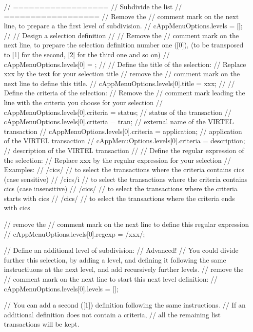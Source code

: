 \documentclass[letterpaper,10pt,english]{sphinxmanual}
\begin{document}
\begin{sphinxVerbatim}[commandchars=\\\{\}]
// ==================
// Subdivide the list
// ==================
// Remove the // comment mark on the next line, to prepare a the first level of subdivision.
// cAppMenuOptions.levels = [];
//
// Design a selection definition
// \PYGZhy{}\PYGZhy{}\PYGZhy{}\PYGZhy{}\PYGZhy{}\PYGZhy{}\PYGZhy{}\PYGZhy{}\PYGZhy{}\PYGZhy{}\PYGZhy{}\PYGZhy{}\PYGZhy{}\PYGZhy{}\PYGZhy{}\PYGZhy{}\PYGZhy{}\PYGZhy{}\PYGZhy{}\PYGZhy{}\PYGZhy{}\PYGZhy{}\PYGZhy{}\PYGZhy{}\PYGZhy{}\PYGZhy{}\PYGZhy{}\PYGZhy{}\PYGZhy{}
// Remove the // comment mark on the next line, to prepare the selection definition number one ([0]), (to be transposed to [1] for the second, [2] for the third one and so on)
// cAppMenuOptions.levels[0] = \PYGZob{}\PYGZcb{};
//
// \PYGZhy{} Define the title of the selection:
// Replace xxx by the text for your selection title
// remove the // comment mark on the next line to define this title.
// cAppMenuOptions.levels[0].title = \PYGZdq{}xxx\PYGZdq{};
//
// \PYGZhy{} Define the criteria of the selection:
// Remove the // comment mark leading the line with the criteria you choose for your selection
// cAppMenuOptions.levels[0].criteria = \PYGZdq{}status\PYGZdq{};       // status of the transaction
// cAppMenuOptions.levels[0].criteria = \PYGZdq{}tran\PYGZdq{};         // external name of the VIRTEL transaction
// cAppMenuOptions.levels[0].criteria = \PYGZdq{}application\PYGZdq{};  // application of the VIRTEL transaction
// cAppMenuOptions.levels[0].criteria = \PYGZdq{}description\PYGZdq{};  // description of the VIRTEL transaction
//
// \PYGZhy{} Define the regular expression of the selection:
// Replace xxx by the regular expression for your selection
// Examples:
//   /cics/      // to select the transactions where the criteria contains \PYGZdq{}cics\PYGZdq{} (case sensitive)
//   /cics/i     // to select the transactions where the criteria contains \PYGZdq{}cics\PYGZdq{} (case insensitive)
//   /\PYGZca{}cics/     // to select the transactions where the criteria starts with \PYGZdq{}cics\PYGZdq{}
//   /cics\PYGZdl{}/     // to select the transactions where the criteria ends with \PYGZdq{}cics\PYGZdq{}

// remove the // comment mark on the next line to define this regular expression
// cAppMenuOptions.levels[0].regexp = /xxx/;

// \PYGZhy{} Define an additional level of subdivision:
// Advanced!
// You could divide further this selection, by adding a level, and defining it following the same instructiuons at the next level, and add recursively further levels.
// remove the // comment mark on the next line to start this next level definition:
// cAppMenuOptions.levels[0].levels = [];



// You can add a second ([1]) definition following the same instructions.
// If an additional definition does not contain a criteria,
// all the remaining list transactions will be kept.
\end{sphinxVerbatim}
\end{document}
